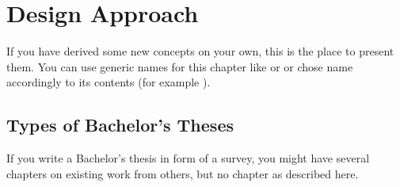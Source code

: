 
\chapter{Design Approach} \label{chapter:designapproach}

If you have derived some new concepts on your own, this is the place
to present them. You can use generic names for this chapter like
 or  or chose name
accordingly to its contents (for example ).

\section{Types of Bachelor's Theses}

If you write a Bachelor's thesis in form of a survey, you might have
several chapters on existing work from others, but no chapter as
described here.


